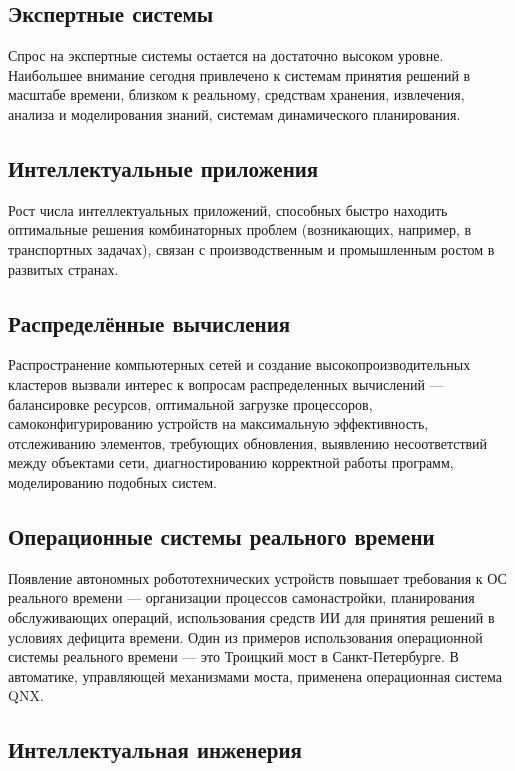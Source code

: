 \subsection{Экспертные системы}

Спрос на экспертные системы остается на достаточно высоком уровне. Наибольшее внимание сегодня привлечено к системам принятия решений в масштабе времени, близком к реальному, средствам хранения, извлечения, анализа и моделирования знаний, системам динамического планирования.

\subsection{Интеллектуальные приложения}

Рост числа интеллектуальных приложений, способных быстро находить оптимальные решения комбинаторных проблем (возникающих, например, в транспортных задачах), связан с производственным и промышленным ростом в развитых странах.

\subsection{Распределённые вычисления}

Распространение компьютерных сетей и создание высокопроизводительных кластеров вызвали интерес к вопросам распределенных вычислений --- балансировке ресурсов, оптимальной загрузке процессоров, самоконфигурированию устройств на максимальную эффективность, отслеживанию элементов, требующих обновления, выявлению несоответствий между объектами сети, диагностированию корректной работы программ, моделированию подобных систем.

\subsection{Операционные системы реального времени}

Появление автономных робототехнических устройств повышает требования к ОС реального времени --- организации процессов самонастройки, планирования обслуживающих операций, использования средств ИИ для принятия решений в условиях дефицита времени. Один из примеров использования операционной системы реального времени --- это Троицкий мост в Санкт-Петербурге. В автоматике, управляющей механизмами моста, применена операционная система QNX.

\subsection{Интеллектуальная инженерия}

